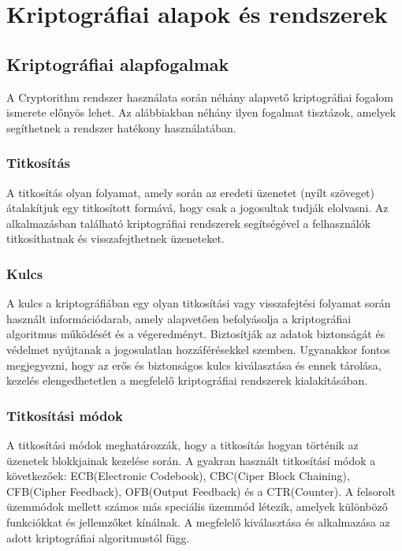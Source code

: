 \chapter{Kriptográfiai alapok és rendszerek}


\section{Kriptográfiai alapfogalmak}
A Cryptorithm rendszer használata során néhány alapvető kriptográfiai fogalom ismerete előnyös lehet. Az alábbiakban néhány ilyen fogalmat tisztázok, amelyek segíthetnek a rendszer hatékony használatában.
\subsection{Titkosítás}
A titkosítás olyan folyamat, amely során az eredeti üzenetet (nyílt szöveget) átalakítjuk egy titkosított formává, hogy csak a jogosultak tudják elolvasni. Az alkalmazásban található kriptográfiai rendszerek segítségével a felhasználók titkosíthatnak és visszafejthetnek üzeneteket.

\subsection{Kulcs}
A kulcs a kriptográfiában egy olyan titkosítási vagy visszafejtési folyamat során használt információdarab, amely alapvetően befolyásolja a kriptográfiai algoritmus működését és a végeredményt. Biztosítják az adatok biztonságát és védelmet nyújtanak a jogosulatlan hozzáférésekkel szemben. Ugyanakkor fontos megjegyezni, hogy az erős és biztonságos kulcs kiválasztása és ennek tárolása, kezelés elengedhetetlen a megfelelő kriptográfiai rendszerek kialakításában.

\newpage
\subsection{Titkosítási módok}
A titkosítási módok meghatározzák, hogy a titkosítás hogyan történik az üzenetek blokkjainak kezelése során. A gyakran használt titkosításí módok a következőek: ECB(Electronic Codebook), CBC(Ciper Block Chaining), CFB(Cipher Feedback), OFB(Output Feedback) és a CTR(Counter).
A felsorolt üzemmódok mellett számos más speciális üzemmód létezik, amelyek különböző funkciókkat és jellemzőket kínálnak. A megfelelő kiválasztása és alkalmazása az adott kriptográfiai algoritmustól függ.

